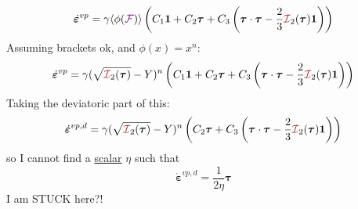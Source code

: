 \[
\dot{\bm\varepsilon}^{vp} = \gamma \langle \phi(\FFF) \rangle 
\left(
C_1 {\bm 1} + C_2  {\bm \tau} + C_3 \left( \bm\tau\cdot\bm\tau -\frac23 {\III}_2(\bm\tau){\bm 1} \right)
\right)
\]
Assuming brackets ok, and $\phi(x)=x^n$:
\[
\dot{\bm\varepsilon}^{vp} = \gamma (\sqrt{{\III}_2(\bm\tau)} - Y)^n 
\left(
C_1 {\bm 1} + C_2  {\bm \tau} + C_3 \left( \bm\tau\cdot\bm\tau -\frac23 {\III}_2(\bm\tau){\bm 1} \right)
\right)
\]
Taking the deviatoric part of this:
\[
\dot{\bm\varepsilon}^{vp,d} 
= \gamma (\sqrt{{\III}_2(\bm\tau)} - Y)^n 
\left(
 C_2  {\bm \tau} + C_3 \left( \bm\tau\cdot\bm\tau -\frac23 {\III}_2(\bm\tau){\bm 1} \right)
\right)
\]
so I cannot find a \underline{scalar} $\eta$ such that 
\[
\dot{\bm\varepsilon}^{vp,d} 
=\frac{1}{2\eta} {\bm \tau}
\]
I am STUCK here?!





































